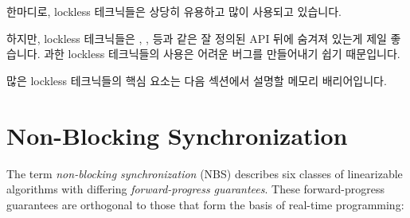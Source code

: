 한마디로, lockless 테크닉들은 상당히 유용하고 많이 사용되고 있습니다.

하지만, lockless 테크닉들은 , ,
 등과 같은 잘 정의된 API 뒤에 숨겨져 있는게 제일 좋습니다.
과한 lockless 테크닉들의 사용은 어려운 버그를 만들어내기 쉽기 때문입니다.

많은 lockless 테크닉들의 핵심 요소는 다음 섹션에서 설명할 메모리 배리어입니다.
\iffalse

In short, lockless techniques are quite useful and are heavily used.

However, it is best if lockless techniques are hidden behind a
well-defined API, such as the \co{inc_count()}, \co{memblock_alloc()},
\co{rcu_read_lock()}, and so on.
The reason for this is that undisciplined use of lockless techniques
is a good way to create difficult bugs.

A key component of many lockless techniques is the memory barrier,
which is described in the following section.
\fi



\section{Non-Blocking Synchronization}
\label{sec:advsync:Non-Blocking Synchronization}

The term \emph{non-blocking synchronization} (NBS) describes six classes of
linearizable algorithms with differing \emph{forward-progress guarantees}.
These forward-progress guarantees are orthogonal to those that form the
basis of real-time programming:

